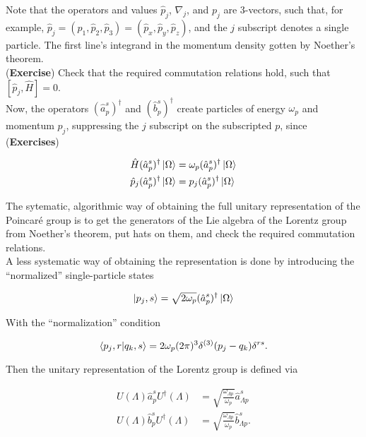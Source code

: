 \noindent Note that the operators and values $\hat{p}_j$, $\nabla_j$, and $p_j$ are 3-vectors, such that, for example, $\hat{p}_j = (\hat{p}_1, \hat{p}_2, \hat{p}_3) = (\hat{p}_x, \hat{p}_y, \hat{p}_z)$, and the $j$ subscript denotes a single particle. The first line's integrand in the momentum density gotten by Noether's theorem. \\
\noindent (\textbf{Exercise}) Check that the required commutation relations hold, such that $[\hat{p}_j,\hat{H}]=0$. \\

\noindent Now, the operators $(\hat{a}_p^s)^\dagger$ and $(\hat{b}_p^s)^\dagger$ create particles of energy $\omega_p$ and momentum $p_j$, suppressing the $j$ subscript on the subscripted $p$, since (\textbf{Exercises})

\begin{align}
\hat{H} (\hat{a}_p^s)^\dagger \ket{\Omega} &= \omega_p (\hat{a}_p^s)^\dagger \ket{\Omega}  \\
\hat{p}_j (\hat{a}_p^s)^\dagger \ket{\Omega} &= p_j (\hat{a}_p^s)^\dagger \ket{\Omega} 
\end{align}

\noindent The sytematic, algorithmic way of obtaining the full unitary representation of the Poincar\'e group is to get the generators of the Lie algebra of the Lorentz group from Noether's theorem, put hats on them, and check the required commutation relations. \\

\noindent A less systematic way of obtaining the representation is done by introducing the ``normalized'' single-particle states

\begin{equation}
\ket{p_j,s} = \sqrt{2 \omega_p} (\hat{a}_p^s)^\dagger \ket{\Omega}
\end{equation}

\noindent With the ``normalization'' condition

\begin{equation}
\braket{p_j,r | q_k, s} = 2 \omega_p (2 \pi)^3 \delta^{(3)} (p_j-q_k) \delta^{rs}.
\end{equation}

\noindent Then the unitary representation of the Lorentz group is defined via

\begin{align}
U(\Lambda) \hat{a}_p^s U^\dagger(\Lambda) &= \sqrt{ \frac{\omega_{\Lambda p}}{\omega_p}} \hat{a}_{\Lambda p}^s \\
U(\Lambda) \hat{b}_p^s U^\dagger(\Lambda) &= \sqrt{ \frac{\omega_{\Lambda p}}{\omega_p}} \hat{b}_{\Lambda p}^s.
\end{align}

